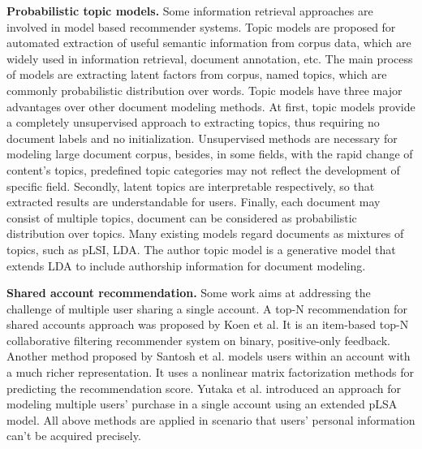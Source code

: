 \documentclass{sig-alternate-05-2015}
\begin{document}
\textbf{Probabilistic topic models.} Some information retrieval approaches are involved in  model based recommender systems. Topic models\cite{blei:lda}\cite{mic:atm}\cite{mark:prob} are proposed for automated extraction of useful semantic information from corpus data, which are widely used in information retrieval, document annotation, etc. The main process of models are extracting latent factors from corpus, named topics, which are commonly probabilistic distribution over words. Topic models have three major advantages over other document modeling methods. At first, topic models provide a completely unsupervised approach to extracting topics, thus requiring no document labels and no initialization. Unsupervised methods are necessary for modeling large document corpus, besides, in some fields, with the rapid change of content's topics, predefined topic categories may not reflect the development of specific field. Secondly, latent topics are interpretable respectively, so that extracted results are understandable for users. Finally, each document may consist of multiple topics, document can be considered as probabilistic distribution over topics. Many existing models regard documents as mixtures of topics, such as pLSI, LDA. The author topic model is a generative model that extends LDA to include authorship information for document modeling.\par
\textbf{Shared account recommendation.} Some work aims at addressing the challenge of multiple user sharing a single account. A top-N recommendation for shared accounts approach was proposed by Koen et al.\cite{koen:top-n} It is an item-based top-N collaborative filtering recommender system on binary, positive-only feedback. Another method proposed by Santosh et al.\cite{kabbur:nlmf} models users within an account with a much richer representation. It uses a nonlinear matrix factorization methods for predicting the recommendation score. Yutaka et al.\cite{yutaka:modeling} introduced an approach for modeling multiple users' purchase in a single account using an extended pLSA model. All above methods are applied in scenario that users' personal information can't be acquired precisely.
\end{document}
